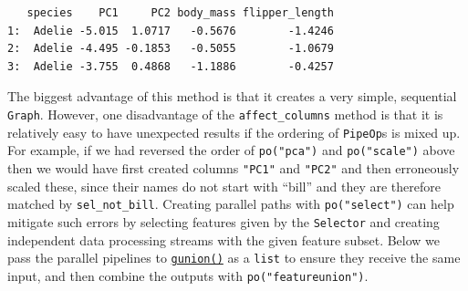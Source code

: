 \begin{verbatim}
   species    PC1     PC2 body_mass flipper_length
1:  Adelie -5.015  1.0717   -0.5676        -1.4246
2:  Adelie -4.495 -0.1853   -0.5055        -1.0679
3:  Adelie -3.755  0.4868   -1.1886        -0.4257
\end{verbatim}

The biggest advantage of this method is that it creates a very simple,
sequential \texttt{Graph}. However, one disadvantage of the
\texttt{affect\_columns} method is that it is relatively easy to have
unexpected results if the ordering of \texttt{PipeOp}s is mixed up. For
example, if we had reversed the order of \texttt{po("pca")} and
\texttt{po("scale")} above then we would have first created columns
\texttt{"PC1"} and \texttt{"PC2"} and then erroneously scaled these,
since their names do not start with ``bill'' and they are therefore
matched by \texttt{sel\_not\_bill}. Creating parallel paths with
\texttt{po("select")} can help mitigate such errors by selecting
features given by the \texttt{Selector} and creating independent data
processing streams with the given feature subset. Below we pass the
parallel pipelines to
\href{https://mlr3pipelines.mlr-org.com/reference/gunion.html}{\texttt{gunion()}}
as a \texttt{list} to ensure they receive the same input, and then
combine the outputs with \texttt{po("featureunion")}.

\begin{Shaded}
\begin{Highlighting}[]
\OtherTok{=} \NormalTok{(}\NormalTok{, } \NormalTok{, }
\OtherTok{=} \NormalTok{(}\NormalTok{, } \NormalTok{,}

\OtherTok{=}\SpecialCharTok{\%\textgreater{}\textgreater{}\%} \NormalTok{(}\NormalTok{)}
\OtherTok{=}\SpecialCharTok{\%\textgreater{}\textgreater{}\%} \NormalTok{(}\NormalTok{)}

\OtherTok{=} \NormalTok{(}\SpecialCharTok{\%\textgreater{}\textgreater{}\%} \NormalTok{(}\NormalTok{)}
\SpecialCharTok{$}\NormalTok{(} \NormalTok{)}
\end{Highlighting}
\end{Shaded}

